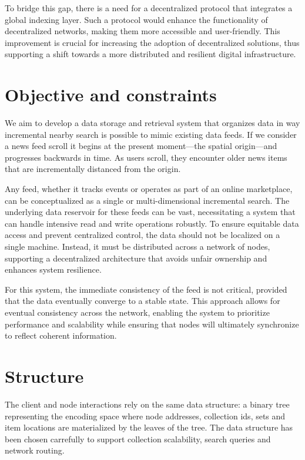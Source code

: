 \documentclass[11pt]{article}
\begin{document}
To bridge this gap, there is a need for a decentralized protocol that integrates a global indexing layer. Such a protocol would enhance the functionality of decentralized networks, making them more accessible and user-friendly. This improvement is crucial for increasing the adoption of decentralized solutions, thus supporting a shift towards a more distributed and resilient digital infrastructure.

\section*{Objective and constraints}
We aim to develop a data storage and retrieval system that organizes data in way incremental nearby search is possible to mimic existing data feeds. 
If we consider a news feed scroll it begins at the present moment—the spatial origin—and progresses backwards in time. As users scroll, they encounter older news items that are incrementally distanced from the origin.

Any feed, whether it tracks events or operates as part of an online marketplace, can be conceptualized as a single or multi-dimensional incremental search. The underlying data reservoir for these feeds can be vast, necessitating a system that can handle intensive read and write operations robustly. To ensure equitable data access and prevent centralized control, the data should not be localized on a single machine. Instead, it must be distributed across a network of nodes, supporting a decentralized architecture that avoids unfair ownership and enhances system resilience.

For this system, the immediate consistency of the feed is not critical, provided that the data eventually converge to a stable state. This approach allows for eventual consistency across the network, enabling the system to prioritize performance and scalability while ensuring that nodes will ultimately synchronize to reflect coherent information.

\section*{Structure}

The client and node interactions rely on the same data structure: a binary tree representing the encoding space where node addresses, collection ids, sets and item locations are materialized by the leaves of the tree. The data structure has been chosen carrefully to support collection scalability, search queries and network routing.
\end{document}

